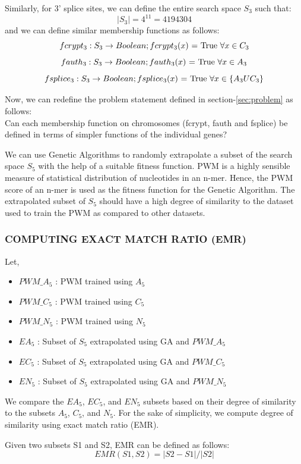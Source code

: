 \documentclass[12pt,a4paper]{article}
\begin{document}
	Similarly, for 3’ splice sites, we can define the entire search space $S_3$ such that:
	$$ |S_3| = 4^{11} = 4194304 $$
	and we can define similar membership functions as follows:
	$$ fcrypt_3:  S_3 \rightarrow Boolean; fcrypt_3(x)\textnormal{ = True  }\forall x \in C_3 $$
	$$ fauth_3: S_3 \rightarrow Boolean; fauth_3(x)\textnormal{ = True  }\forall x \in A_3 $$
	$$ fsplice_3: S_3 \rightarrow Boolean; fsplice_3(x)\textnormal{ = True  }\forall x \in \{A_3 U C_3\} $$
	
	Now, we can redefine the problem statement defined in section-\ref{sec:problem} as follows:\\
	Can each membership function on chromosomes (fcrypt, fauth and fsplice) be defined in terms of simpler functions of the individual genes? \par
	
	We can use Genetic Algorithms to randomly extrapolate a subset of the search space $S_5$ with the help of a suitable fitness function. PWM is a highly sensible measure of statistical distribution of nucleotides in an n-mer. Hence, the PWM score of an n-mer is used as the fitness function for the Genetic Algorithm. The extrapolated subset of $S_5$ should have a high degree of similarity to the dataset used to train the PWM as compared to other datasets. \par
	
	\subsubsection{COMPUTING EXACT MATCH RATIO (EMR)}
	Let,
	\begin{itemize}
		\item $PWM\_A_5$ : PWM trained using $A_5$
		\item $PWM\_C_5$ : PWM trained using $C_5$
		\item $PWM\_N_5$ : PWM trained using $N_5$
		\item $EA_5$ : Subset of $S_5$ extrapolated using GA and $PWM\_A_5$
		\item $EC_5$ : Subset of $S_5$ extrapolated using GA and $PWM\_C_5$
		\item $EN_5$ : Subset of $S_5$ extrapolated using GA and $PWM\_N_5$
	\end{itemize}
	
	We compare the $EA_5$, $EC_5$, and $EN_5$ subsets based on their degree of similarity to the subsets $A_5$, $C_5$, and $N_5$. For the sake of simplicity, we compute degree of similarity using exact match ratio (EMR). \par
	Given two subsets S1 and S2, EMR can be defined as follows:
	\begin{equation}
		EMR(S1, S2) = |S2 - S1| / |S2|
		\label{eq-emr}
	\end{equation}
	
\end{document}
